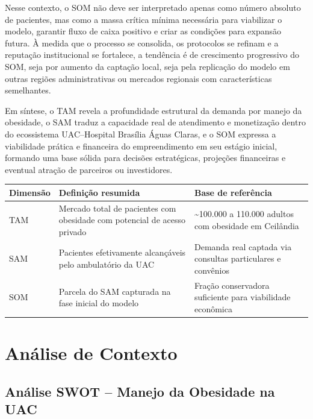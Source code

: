 \documentclass[12pt]{article}
\begin{document}
Nesse contexto, o SOM não deve ser interpretado apenas como número absoluto de pacientes, mas como a massa crítica mínima necessária para viabilizar o modelo, garantir fluxo de caixa positivo e criar as condições para expansão futura. À medida que o processo se consolida, os protocolos se refinam e a reputação institucional se fortalece, a tendência é de crescimento progressivo do SOM, seja por aumento da captação local, seja pela replicação do modelo em outras regiões administrativas ou mercados regionais com características semelhantes.

Em síntese, o TAM revela a profundidade estrutural da demanda por manejo da obesidade, o SAM traduz a capacidade real de atendimento e monetização dentro do ecossistema UAC–Hospital Brasília Águas Claras, e o SOM expressa a viabilidade prática e financeira do empreendimento em seu estágio inicial, formando uma base sólida para decisões estratégicas, projeções financeiras e eventual atração de parceiros ou investidores.

\begin{table}[htbp]
\centering
\scriptsize
\setlength{\tabcolsep}{2pt}
\begin{tabularx}{\textwidth}{%
>{\centering\arraybackslash}m{}
>{\raggedright\arraybackslash}X
>{\raggedright\arraybackslash}X}
\toprule
Dimensão & Definição resumida & Base de referência \\
\midrule
TAM & Mercado total de pacientes com obesidade com potencial de acesso privado & \textasciitilde{}100.000 a 110.000 adultos com obesidade em Ceilândia \\
SAM & Pacientes efetivamente alcançáveis pelo ambulatório da UAC & Demanda real captada via consultas particulares e convênios \\
SOM & Parcela do SAM capturada na fase inicial do modelo & Fração conservadora suficiente para viabilidade econômica \\
\bottomrule
\end{tabularx}
\normalsize
\end{table}

\FGVNewPage

\section{Análise de Contexto}
\label{sec:org872d21e}
\subsection{Análise SWOT – Manejo da Obesidade na UAC}
\label{sec:org5c572e7}
\end{document}
